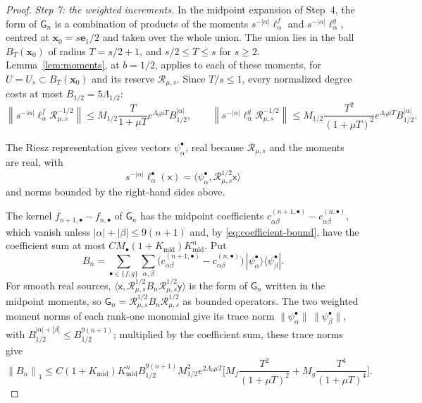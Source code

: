 \documentclass[11pt]{amsart}
\numberwithin{equation}{section}
\theoremstyle{definition}
\newcommand{\JointRes}{\mathcal R}
\newcommand{\sx}{\mathsf x}
\newcommand{\sy}{\mathsf y}
\newcommand{\bx}{\mathbf x}
\newcommand{\eone}{\mathbf e_1}
\newcommand{\norm}[1]{\left\|#1\right\|}
\newcommand{\ip}[2]{\langle #1,#2\rangle}
\begin{document}
\begin{proof}
\smallskip
\emph{Step 7: the weighted increments.} In the midpoint expansion of
Step~4, the form of \(\mathsf G_n\) is a combination of products of the
moments \(s^{-|\alpha|}\ell^f_\alpha\) and \(s^{-|\alpha|}\ell^g_\alpha\),
centred at \(\bx_0=s\eone/2\) and taken over the whole union. The union
lies in the ball \(B_T(\bx_0)\) of radius \(T=s/2+1\), and
\(s/2\le T\le s\) for \(s\ge2\). Lemma~\ref{lem:moments}, at \(b=1/2\),
applies to each of these moments, for \(U=U_s\subset B_T(\bx_0)\) and
its reserve \(\JointRes_{\mu,s}\).
Since \(T/s\le1\), every normalized degree costs at most
\(B_{1/2}=5\Lambda_{1/2}\):
\[
 \norm{s^{-|\alpha|}\ell^f_\alpha\JointRes_{\mu,s}^{-1/2}}
 \le M_{1/2}\frac{T}{1+\mu T}e^{\Lambda_0\mu T}B_{1/2}^{|\alpha|},
 \qquad
 \norm{s^{-|\alpha|}\ell^g_\alpha\JointRes_{\mu,s}^{-1/2}}
 \le M_{1/2}\frac{T^2}{(1+\mu T)^2}e^{\Lambda_0\mu T}B_{1/2}^{|\alpha|}.
\]

The Riesz
representation gives vectors \(\psi^\bullet_\alpha\), real because
\(\JointRes_{\mu,s}\) and the moments are real, with
\[
 s^{-|\alpha|}\ell^\bullet_\alpha(\sx)
 =\ip{\psi^\bullet_\alpha}{\JointRes_{\mu,s}^{1/2}\sx}
\]
and norms bounded by the right-hand sides above.

The kernel \(f_{n+1,\bullet}-f_{n,\bullet}\) of \(\mathsf G_n\) has the
midpoint coefficients
\(c^{(n+1,\bullet)}_{\alpha\beta}-c^{(n,\bullet)}_{\alpha\beta}\), which
vanish unless \(|\alpha|+|\beta|\le9(n+1)\) and, by
\eqref{eq:coefficient-bound}, have the coefficient sum at most
\(CM_\bullet(1+K_{\mathrm{mid}})K_{\mathrm{mid}}^n\). Put
\[
 B_n=\sum_{\bullet\in\{f,g\}}\sum_{\alpha,\beta}
 \bigl(c^{(n+1,\bullet)}_{\alpha\beta}-c^{(n,\bullet)}_{\alpha\beta}\bigr)
 \,|\psi^\bullet_\alpha\rangle\langle\psi^\bullet_\beta| .
\]
For smooth real sources,
\(\ip{\sx}{\JointRes_{\mu,s}^{1/2}B_n\JointRes_{\mu,s}^{1/2}\sy}\) is the
form of \(\mathsf G_n\) written in the midpoint moments, so
\(\mathsf G_n=\JointRes_{\mu,s}^{1/2}B_n\JointRes_{\mu,s}^{1/2}\) as
bounded operators. The two weighted moment norms of each rank-one
monomial give its trace norm
\(\lVert\psi^\bullet_\alpha\rVert\,\lVert\psi^\bullet_\beta\rVert\), with
\(B_{1/2}^{|\alpha|+|\beta|}\le B_{1/2}^{9(n+1)}\); multiplied by the
coefficient sum, these trace norms give
\[
 \norm{B_n}_1
 \le C(1+K_{\mathrm{mid}})K_{\mathrm{mid}}^nB_{1/2}^{9(n+1)}
 M_{1/2}^2e^{2\Lambda_0\mu T}
 \biggl[M_f\frac{T^2}{(1+\mu T)^2}+M_g\frac{T^4}{(1+\mu T)^4}\biggr].
\]


\end{proof}
\end{document}
